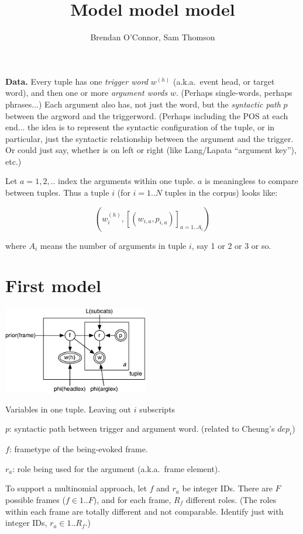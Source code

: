 \documentclass[11pt,letterpaper]{article}
\title{
  Model model model
}
\author{
Brendan O'Connor, Sam Thomson
}
\newenvironment{itemizesquish}{\begin{list}{\labelitemi}{\setlength{\itemsep}{0em}\setlength{\labelwidth}{0.5em}\setlength{\leftmargin}{\labelwidth}\addtolength{\leftmargin}{\labelsep}}}{\end{list}}
\begin{document}
\maketitle

\textbf{Data.} Every tuple has one \emph{trigger word} $w^{(h)}$ (a.k.a.~event head, or target word), and then one or more \emph{argument words} $w$.  (Perhaps single-words, perhaps phrases...)  Each argument also has, not just the word, but the \emph{syntactic path} $p$ between the argword and the triggerword.  (Perhaps including the POS at each end... the idea is to represent the syntactic configuration of the tuple, or in particular, just the syntactic relationship between the argument and the trigger.  Or could just say, whether is on left or right (like Lang/Lapata ``argument key''), etc.)

Let $a=1,2,..$ index the arguments within one tuple.  $a$ is meaningless to compare between tuples.  Thus a tuple $i$ (for $i=1..N$ tuples in the corpus) looks like:

\[ (w^{(h)}_i, [(w_{i,a}, p_{i,a})]_{a=1..A_i}) \]

where $A_i$ means the number of arguments in tuple $i$, say 1 or 2 or 3 or so.

\section{First model}

\includegraphics[width=2.5in]{diagram}

Variables in one tuple.  Leaving out $i$ subscripts

\begin{itemizesquish}
  \item $p$: syntactic path between trigger and argument word.  (related to Cheung's $dep_i$)
  \item $f$: frametype of the being-evoked frame.
  \item $r_a$: role being used for the argument (a.k.a.~frame element).
\end{itemizesquish}

To support a multinomial approach, let $f$ and $r_a$ be integer IDs.
There are $F$ possible frames ($f \in 1..F$), and for each frame, $R_f$ different roles.  (The roles within each frame are totally different and not comparable.  Identify just with integer IDs, $r_a \in 1..R_f$.)
\end{document}

